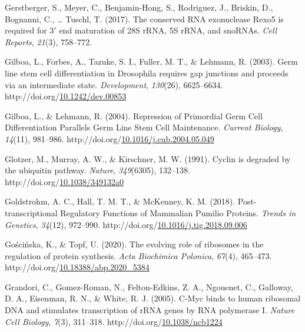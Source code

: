 \documentclass[12pt,oneside]{reedthesis}
\newlength{\cslhangindent}
\newenvironment{CSLReferences}[2] %
 {%
  \setlength{\parindent}{0pt}
  \ifodd #1 \everypar{\setlength{\hangindent}{\cslhangindent}}\ignorespaces\fi
  \ifnum #2 > 0
  \setlength{\parskip}{#2\baselineskip}
  \fi
 }%
 {}
\begin{document}
\begin{CSLReferences}{1}{0}
\leavevmode{}%
Gerstberger, S., Meyer, C., Benjamin-Hong, S., Rodriguez, J., Briskin, D., Bognanni, C., \ldots{} Tuschl, T. (2017). The conserved {RNA} exonuclease {Rexo5} is required for 3{\({'}\)} end maturation of {28S rRNA}, {5S rRNA}, and {snoRNAs}. \emph{Cell Reports}, \emph{21}(3), 758--772.

\leavevmode{}%
Gilboa, L., Forbes, A., Tazuke, S. I., Fuller, M. T., \& Lehmann, R. (2003). Germ line stem cell differentiation in {Drosophila} requires gap junctions and proceeds via an intermediate state. \emph{Development}, \emph{130}(26), 6625--6634. http://doi.org/\href{https://doi.org/10.1242/dev.00853}{10.1242/dev.00853}

\leavevmode{}%
Gilboa, L., \& Lehmann, R. (2004). Repression of {Primordial Germ Cell Differentiation Parallels Germ Line Stem Cell Maintenance}. \emph{Current Biology}, \emph{14}(11), 981--986. http://doi.org/\href{https://doi.org/10.1016/j.cub.2004.05.049}{10.1016/j.cub.2004.05.049}

\leavevmode{}%
Glotzer, M., Murray, A. W., \& Kirschner, M. W. (1991). Cyclin is degraded by the ubiquitin pathway. \emph{Nature}, \emph{349}(6305), 132--138. http://doi.org/\href{https://doi.org/10.1038/349132a0}{10.1038/349132a0}

\leavevmode{}%
Goldstrohm, A. C., Hall, T. M. T., \& McKenney, K. M. (2018). Post-transcriptional {Regulatory Functions} of {Mammalian Pumilio Proteins}. \emph{Trends in Genetics}, \emph{34}(12), 972--990. http://doi.org/\href{https://doi.org/10.1016/j.tig.2018.09.006}{10.1016/j.tig.2018.09.006}

\leavevmode{}%
Gościńska, K., \& Topf, U. (2020). The evolving role of ribosomes in the regulation of protein synthesis. \emph{Acta Biochimica Polonica}, \emph{67}(4), 465--473. http://doi.org/\href{https://doi.org/10.18388/abp.2020_5384}{10.18388/abp.2020\_5384}

\leavevmode{}%
Grandori, C., Gomez-Roman, N., Felton-Edkins, Z. A., Ngouenet, C., Galloway, D. A., Eisenman, R. N., \& White, R. J. (2005). C-{Myc} binds to human ribosomal {DNA} and stimulates transcription of {rRNA} genes by {RNA} polymerase {I}. \emph{Nature Cell Biology}, \emph{7}(3), 311--318. http://doi.org/\href{https://doi.org/10.1038/ncb1224}{10.1038/ncb1224}


\end{CSLReferences}
\end{document}
